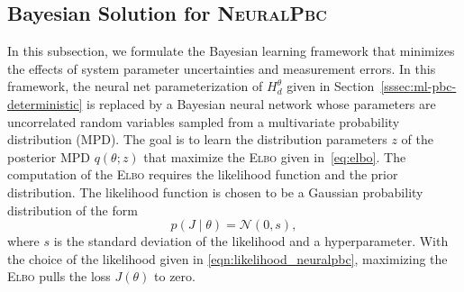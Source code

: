 \subsection{Bayesian Solution for \textsc{NeuralPbc}}
\label{sssec:ml-pbc-bayes}
In this subsection, we formulate the Bayesian learning framework that minimizes
the effects of system parameter uncertainties and measurement errors. 
%
In this framework, the neural net parameterization of $H^\theta_d$ given in
Section~\ref{sssec:ml-pbc-deterministic} is replaced by a Bayesian neural
network whose parameters are uncorrelated random variables sampled from a
multivariate probability distribution (MPD).
%
The goal is to learn the distribution parameters $z$ of the posterior MPD
$q(\theta;z)$ that maximize the \textsc{Elbo} given in~\eqref{eq:elbo}. 
%
%
The computation of the \textsc{Elbo} requires the likelihood function and the
prior distribution.
%
The likelihood function is chosen to be a Gaussian probability
distribution of the form
\begin{equation}
    p(J \mid \theta) = \mathcal{N}\left(0, s \right),
    \label{eqn:likelihood_neuralpbc}
\end{equation}
where $s$ is the standard deviation of the likelihood and a hyperparameter. 
%
With the choice of the likelihood given in \eqref{eqn:likelihood_neuralpbc},
maximizing the \textsc{Elbo} pulls the loss $J(\theta)$ to zero.
%

